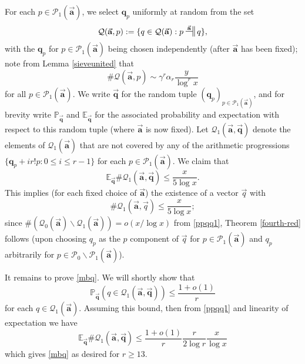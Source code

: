 \documentclass[11pt]{amsart}
\numberwithin{equation}{section}  %
\theoremstyle{remark}
\theoremstyle{plain}
\numberwithin{equation}{section}
\newcommand{\E}{\mathbb{E}}  %
\newcommand{\PR}{\mathbb{P}}  %
\renewcommand{\leq}{\leqslant}
\renewcommand{\geq}{\geqslant}
\renewcommand{\(}{\left(}
\renewcommand{\)}{\right)}
\newcommand{\asym}{\sim}   %
\newcommand{\relra}{\nsdtstile{}{\vect{\mathbf{a}}}} %
\newcommand{\vect}[1]{{\ensuremath{\vec{#1}}}}
\newcommand{\PP}{\mathcal{P}}
\newcommand{\QQ}{\mathcal{Q}}
\begin{document}
For each $p \in \PP_1(\vect{\mathbf{a}})$, we select $\mathbf{q}_p$ uniformly at random from the set
\begin{equation}\label{Bp-def}
\QQ(\vect{\mathbf{a}}, p) := \{ q \in \QQ(\vect{\mathbf{a}}): p \relra q \}, 
\end{equation}
with the $\mathbf{q}_p$ for $p \in \PP_1(\vect{\mathbf{a}})$ being chosen independently (after $\vect{\mathbf{a}}$ has been fixed); note from Lemma \ref{sieveunited} that
\begin{equation}\label{Bp-size}
\# \QQ(\vect{\mathbf{a}}, p) \asym \gamma^r\alpha_r\frac y{\log^r x}
\end{equation}
for all $p \in \PP_1(\vect{\mathbf{a}})$.  We write
$\vect{\mathbf{q}}$ for the random tuple $(\mathbf{q}_p)_{p \in
  \PP_1(\vect{\mathbf{a}}) }$, and for brevity write
 $\PR_\vect{\mathbf{q}}$ and $\E_\vect{\mathbf{q}}$ for the associated 
probability and expectation with respect to this random tuple 
(where $\vect{\mathbf{a}}$ is now fixed).
  Let $\QQ_1(\vect{\mathbf{a}}, \vect{\mathbf{q}})$ denote the elements of $\QQ_1(\vect{\mathbf{a}})$ that are not covered by any of the arithmetic progressions $\{ \mathbf{q}_p + i r! p: 0 \leq i \leq r-1\}$ for each $p \in \PP_1(\vect{\mathbf{a}})$.  We claim that
\begin{equation}\label{mbq}
 \E_\vect{\mathbf{q}}  \# \QQ_1(\vect{\mathbf{a}}, \vect{\mathbf{q}}) \leq  \frac{x}{5\log x}.
\end{equation}
This implies (for each fixed choice of $\vect{\mathbf{a}}$) the existence of a vector $\vect{q}$ with
$$  \# \QQ_1(\vect{\mathbf{a}}, \vect{q}) \leq  \frac{x}{5\log x};$$
since $\# (\QQ_0(\vect{\mathbf{a}}) \backslash
\QQ_1(\vect{\mathbf{a}})) = o(x/\log x)$ from \eqref{ppqq1}, Theorem
\ref{fourth-red} follows (upon choosing 
$q_p$ as the $p$ component of $\vect{q}$ for  $p\in\PP_1(\vect{\mathbf{a}})$ and  $q_p$ arbitrarily for $p \in \PP_0 \backslash \PP_1(\vect{\mathbf{a}})$).

It remains to prove \eqref{mbq}.  We will shortly show that
\begin{equation}\label{pqr}
 \PR_\vect{\mathbf{q}} ( q \in \QQ_1(\vect{\mathbf{a}}, \vect{\mathbf{q}}) ) \leq \frac{1+o(1)}{r}
\end{equation}
for each $q \in \QQ_1(\vect{\mathbf{a}})$.  Assuming
this bound, then from \eqref{ppqq1} and linearity of expectation we
have
$$
 \E_\vect{\mathbf{q}}  \# \QQ_1(\vect{\mathbf{a}}, \vect{\mathbf{q}}) \leq \frac{1+o(1)}{r} \frac{r}{2\log r} \frac{x}{\log x}$$
which gives \eqref{mbq} as desired for $r \geq 13$.
\end{document}

